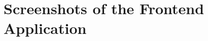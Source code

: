 \documentclass{utitcphd_overleaf}
\begin{document}
\chapter{Screenshots of the Frontend Application}
\label{app:additionaldata}



\listoffigures
\listoftables



  
\end{document}
